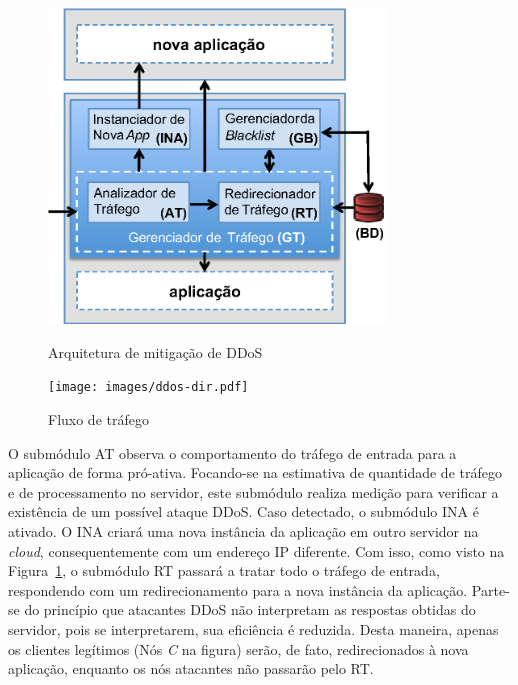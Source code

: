 \begin{figure}[t!]
  \centering
  \begin{minipage}[b]{0.59\linewidth}
    \centering
    \includegraphics[width=0.8\textwidth]{images/arq.eps}
	\caption{Arquitetura de mitigação de DDoS}
	\label{fig:arq}
  \end{minipage}
  \begin{minipage}[b]{0.4\linewidth}
    \centering
    \texttt{[image: images/ddos-dir.pdf]}
	\caption{Fluxo de tráfego}
	\label{fig:traf-ddos}
  \end{minipage}

\end{figure}



O submódulo AT observa o comportamento do tráfego de entrada para a aplicação de forma pró-ativa. Focando-se na estimativa de quantidade de tráfego e de processamento no servidor, este submódulo realiza medição para verificar a existência de um possível ataque DDoS. Caso detectado, o submódulo INA é ativado. O INA criará uma nova instância da aplicação em outro servidor na \emph{cloud}, consequentemente com um endereço IP diferente. %
Com isso, como visto na Figura~\ref{fig:traf-ddos}, o submódulo RT passará a tratar todo o tráfego de entrada, respondendo com um redirecionamento para a nova instância da aplicação. Parte-se do princípio que atacantes DDoS não interpretam as respostas obtidas do servidor, pois se interpretarem, sua eficiência é reduzida. Desta maneira, apenas os clientes legítimos (Nós \emph{C} na figura) serão, de fato, redirecionados à nova aplicação, enquanto os nós atacantes não passarão pelo RT.

